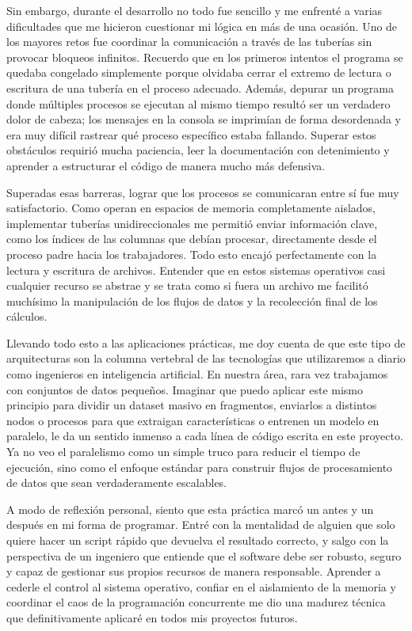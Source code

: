 Sin embargo, durante el desarrollo no todo fue sencillo y me enfrenté a varias dificultades que me hicieron cuestionar mi lógica en más de una ocasión. Uno de los mayores retos fue coordinar la comunicación a través de las tuberías sin provocar bloqueos infinitos. Recuerdo que en los primeros intentos el programa se quedaba congelado simplemente porque olvidaba cerrar el extremo de lectura o escritura de una tubería en el proceso adecuado. Además, depurar un programa donde múltiples procesos se ejecutan al mismo tiempo resultó ser un verdadero dolor de cabeza; los mensajes en la consola se imprimían de forma desordenada y era muy difícil rastrear qué proceso específico estaba fallando. Superar estos obstáculos requirió mucha paciencia, leer la documentación con detenimiento y aprender a estructurar el código de manera mucho más defensiva.

Superadas esas barreras, lograr que los procesos se comunicaran entre sí fue muy satisfactorio. Como operan en espacios de memoria completamente aislados, implementar tuberías unidireccionales me permitió enviar información clave, como los índices de las columnas que debían procesar, directamente desde el proceso padre hacia los trabajadores. Todo esto encajó perfectamente con la lectura y escritura de archivos. Entender que en estos sistemas operativos casi cualquier recurso se abstrae y se trata como si fuera un archivo me facilitó muchísimo la manipulación de los flujos de datos y la recolección final de los cálculos.

Llevando todo esto a las aplicaciones prácticas, me doy cuenta de que este tipo de arquitecturas son la columna vertebral de las tecnologías que utilizaremos a diario como ingenieros en inteligencia artificial. En nuestra área, rara vez trabajamos con conjuntos de datos pequeños. Imaginar que puedo aplicar este mismo principio para dividir un dataset masivo en fragmentos, enviarlos a distintos nodos o procesos para que extraigan características o entrenen un modelo en paralelo, le da un sentido inmenso a cada línea de código escrita en este proyecto. Ya no veo el paralelismo como un simple truco para reducir el tiempo de ejecución, sino como el enfoque estándar para construir flujos de procesamiento de datos que sean verdaderamente escalables.

A modo de reflexión personal, siento que esta práctica marcó un antes y un después en mi forma de programar. Entré con la mentalidad de alguien que solo quiere hacer un script rápido que devuelva el resultado correcto, y salgo con la perspectiva de un ingeniero que entiende que el software debe ser robusto, seguro y capaz de gestionar sus propios recursos de manera responsable. Aprender a cederle el control al sistema operativo, confiar en el aislamiento de la memoria y coordinar el caos de la programación concurrente me dio una madurez técnica que definitivamente aplicaré en todos mis proyectos futuros.
